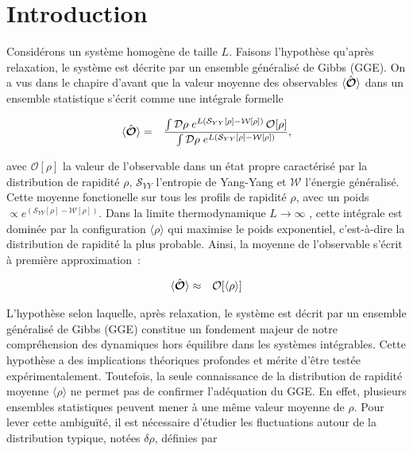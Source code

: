 \minitoc

\section*{Introduction}

Considérons un système homogène de taille $L$. Faisons l'hypothèse qu'après relaxation, le système est décrite par un ensemble généralisé de Gibbs (GGE). On a vus dans le chapire d'avant que la valeur moyenne des observables $\langle\hat{\bm{\mathcal{O}}}\rangle$ dans un ensemble statistique s'écrit comme une intégrale formelle

\begin{eqnarray}
	\langle \hat{\bm{\mathcal{O}}} \rangle & = & \frac{\int \mathcal{D} \rho \; e^{L (\mathcal{S}_{YY}[\rho] - \mathcal{W}[\rho])} \, \mathcal{O}[\rho]}{\int \mathcal{D} \rho \; e^{L (\mathcal{S}_{YY}[\rho] - \mathcal{W}[\rho])}}, \label{chap:fluctu:eq:ensemble_average}
\end{eqnarray}

avec $\mathcal{O}[\rho]$ la valeur de l’observable dans un état propre caractérisé par la distribution de rapidité $\rho$, $\mathcal{S}_{YY}$ l'entropie de Yang-Yang et $\mathcal{W}$ l'énergie généralisé.
Cette moyenne fonctionelle sur tous les profils de rapidité $\rho$, avec un poids $\propto e^{(\mathcal{S}_{YY}[\rho] - \mathcal{W}[\rho])}$. Dans la limite thermodynamique $L \to \infty$ , cette intégrale est dominée par la configuration $\langle \rho \rangle$ qui maximise le poids exponentiel, c’est-à-dire la distribution de rapidité la plus probable. Ainsi, la moyenne de l’observable s’écrit à première approximation :


\begin{eqnarray}
	\langle \hat{\bm{\mathcal{O}}} \rangle & \approx & \mathcal{O}[\langle \rho \rangle ]	
	\label{chap:fluctu:eq:ensemble_average:approx}
\end{eqnarray}

	


L’hypothèse selon laquelle, après relaxation, le système est décrit par un ensemble généralisé de Gibbs (GGE) constitue un fondement majeur de notre compréhension des dynamiques hors équilibre dans les systèmes intégrables. Cette hypothèse a des implications théoriques profondes et mérite d’être testée expérimentalement. Toutefois, la seule connaissance de la distribution de rapidité moyenne \( \langle \rho \rangle \) ne permet pas de confirmer l'adéquation du GGE. En effet, plusieurs ensembles statistiques peuvent mener à une même valeur moyenne de \( \rho \). Pour lever cette ambiguïté, il est nécessaire d’étudier les fluctuations autour de la distribution typique, notées \( \delta \rho \), définies par 

